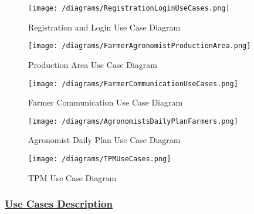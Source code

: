 		\vspace{0.3cm}
		
		\begin{figure}[h!]
			\centering
			\texttt{[image: /diagrams/RegistrationLoginUseCases.png]}
			\caption{Registration and Login Use Case Diagram}
		\end{figure}
	
		\begin{figure}[h!]
			\centering
			\texttt{[image: /diagrams/FarmerAgronomistProductionArea.png]}
			\caption{Production Area Use Case Diagram}
		\end{figure}
	
		\begin{figure}[h!]
		\centering
			\texttt{[image: /diagrams/FarmerCommunicationUseCases.png]}
			\caption{Farmer Communication Use Case Diagram}
		\end{figure}
	
		\begin{figure}[h!]
			\centering
			\texttt{[image: /diagrams/AgronomistsDailyPlanFarmers.png]}
			\caption{Agronomist Daily Plan Use Case Diagram}
		\end{figure}
	
		\begin{figure}[h!]
			\centering
			\texttt{[image: /diagrams/TPMUseCases.png]}
			\caption{TPM Use Case Diagram}
		\end{figure}
			
		\FloatBarrier
	
	\subsubsection[Use Cases Description]{\hyperlink{toc}{Use Cases Description}}
		\label{sec:useCases}
		
